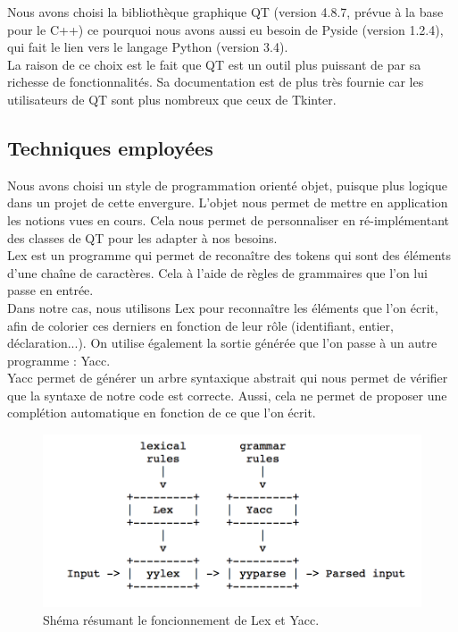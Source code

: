 \documentclass[a4paper,12pt]{article}
\begin{document}
	Nous avons choisi la bibliothèque graphique QT (version 4.8.7, prévue à la base pour le C++) ce pourquoi nous avons aussi eu besoin de Pyside (version 1.2.4), qui fait le lien vers le langage Python (version 3.4).\\
	
	La raison de ce choix est le fait que QT est un outil plus puissant de par sa richesse de fonctionnalités. Sa documentation est de plus très fournie car les utilisateurs de QT sont plus nombreux que ceux de Tkinter.
	
	\subsection{Techniques employées}
	
	Nous avons choisi un style de programmation orienté objet, puisque plus logique dans un projet de cette envergure. L'objet nous permet de mettre en application les notions vues en cours. Cela nous permet de personnaliser en ré-implémentant des classes de QT pour les adapter à nos besoins.\\
	
	Lex est un programme qui permet de reconaître des tokens qui sont des éléments d'une chaîne de caractères. Cela à l'aide de règles de grammaires que l'on lui passe en entrée.\\
	Dans notre cas, nous utilisons Lex pour reconnaître les éléments que l'on écrit, afin de colorier ces derniers en fonction de leur rôle (identifiant, entier, déclaration...). On utilise également la sortie générée que l'on passe à un autre programme : Yacc.\\
	
	Yacc permet de générer un arbre syntaxique abstrait qui nous permet de vérifier que la syntaxe de notre code est correcte. Aussi, cela ne permet de proposer une complétion automatique en fonction de ce que l'on écrit.\\
	
	\begin{figure}[h!]
		\begin{center}
			\includegraphics[scale=0.7]{images/schema_lex_yacc}
			\caption{Shéma résumant le foncionnement de Lex et Yacc.}
		\end{center}
	\end{figure}
	
\end{document}
